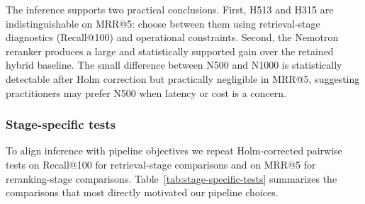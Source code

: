 \begin{table}[htbp]
    \centering
    \footnotesize
    \caption{Formal statistical tests on per-query MRR@5 for the English TRAIN split. The Friedman row is the omnibus test over all tested systems and 14,977 queries; pairwise rows use two-sided Wilcoxon signed-rank tests with Holm correction over all pairwise comparisons. Pairwise mean differences are computed as the second system minus the first.}\label{tab:formal-statistical-tests}
\end{table}

The inference supports two practical conclusions. First, H513 and H315 are indistinguishable on MRR@5: choose between them using retrieval-stage diagnostics (Recall@100) and operational constraints. Second, the Nemotron reranker produces a large and statistically supported gain over the retained hybrid baseline. The small difference between N500 and N1000 is statistically detectable after Holm correction but practically negligible in MRR@5, suggesting practitioners may prefer N500 when latency or cost is a concern.

\subsubsection{Stage-specific tests}

To align inference with pipeline objectives we repeat Holm-corrected pairwise tests on Recall@100 for retrieval-stage comparisons and on MRR@5 for reranking-stage comparisons. Table~\ref{tab:stage-specific-tests} summarizes the comparisons that most directly motivated our pipeline choices.

